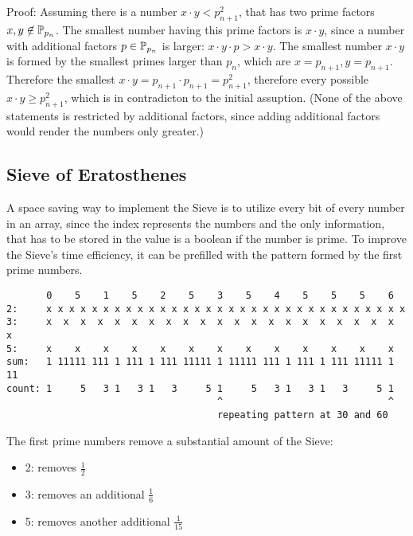 \documentclass[a4paper,10pt]{article}
\begin{document}
Proof:
Assuming there is a number $x \cdot y < p_{n+1}^2$,
that has two prime factors $x, y \not\in \mathbb{P}_{p_n}$.
The smallest number having this prime factors is $x \cdot y$,
since a number with additional factors $p \in \mathbb{P}_{p_n}$ is larger:
$x \cdot y \cdot p > x \cdot y$.
The smallest number $x \cdot y$ is formed by the smallest primes larger than $p_n$,
which are $x = p_{n+1}, y = p_{n+1}$.
Therefore the smallest $x \cdot y = p_{n+1} \cdot p_{n+1} = p_{n+1}^2$,
therefore every possible $x \cdot y \geq p_{n+1}^2$,
which is in contradicton to the initial assuption.
(None of the above statements is restricted by additional factors,
since adding additional factors would render the numbers only greater.)

\rightline{$\square$}




\subsection{Sieve of Eratosthenes}

A space saving way to implement the Sieve
is to utilize every bit of every number in an array,
since the index represents the numbers and the only information,
that has to be stored in the value is a boolean if the number is prime.
To improve the Sieve's time efficiency,
it can be prefilled with the pattern formed by the first prime numbers.

\begin{small}
\begin{verbatim}
       0    5    1    5    2    5    3    5    4    5    5    5    6
2:     x x x x x x x x x x x x x x x x x x x x x x x x x x x x x x x x
3:     x  x  x  x  x  x  x  x  x  x  x  x  x  x  x  x  x  x  x  x  x  x
5:     x    x    x    x    x    x    x    x    x    x    x    x    x
sum:   1 11111 111 1 111 1 111 11111 1 11111 111 1 111 1 111 11111 1 11
count: 1     5   3 1   3 1   3     5 1     5   3 1   3 1   3     5 1
                                     ^                             ^
                                     repeating pattern at 30 and 60
\end{verbatim}
\end{small}

The first prime numbers remove a substantial amount of the Sieve:
\begin{itemize}
 \item 2: removes $\frac{1}{2}$
 \item 3: removes an additional $\frac{1}{6}$
 \item 5: removes another additional $\frac{1}{15}$
\end{itemize}
\end{document}
